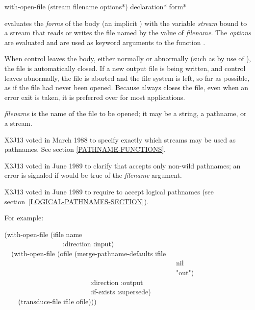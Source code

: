 \begin{defmac}
with-open-file (stream filename {options}*)
               {declaration}* {form}*

evaluates the \emph{forms} of the body (an implicit ) with the variable
\emph{stream} bound to a stream that reads or writes the file named by the
value of \emph{filename}.
The \emph{options} are evaluated and are used as keyword arguments to
the function .

When control leaves the body, either normally or abnormally (such as by
use of ), the file is automatically closed.  If a new
output file is being written, and control leaves abnormally, the file is
aborted and the file system is left, so far as possible, as if the file
had never been opened.  Because  always closes the
file, even when an error exit is taken, it is preferred over  for
most applications.

\emph{filename} is the name of the file to be opened; it may be a string,
a pathname, or a stream.

\begin{new}
X3J13 voted in March 1988
to specify exactly which streams may be used as pathnames.
See section \ref{PATHNAME-FUNCTIONS}.
\end{new}

\begin{newer}
X3J13 voted in June 1989 
to clarify that  accepts only non-wild pathnames;
an error is signaled if  would be true of
the \emph{filename} argument.
\end{newer}

\begin{newer}
X3J13 voted in June 1989  to require 
to accept logical pathnames (see section~\ref{LOGICAL-PATHNAMES-SECTION}).
\end{newer}


For example:
\begin{lisp}
(with-open-file (ifile name \\
~~~~~~~~~~~~~~~~~:direction :input) \\
~~(with-open-file (ofile (merge-pathname-defaults ifile \\
~~~~~~~~~~~~~~~~~~~~~~~~~~~~~~~~~~~~~~~~~~~~~~~~~~nil \\
~~~~~~~~~~~~~~~~~~~~~~~~~~~~~~~~~~~~~~~~~~~~~~~~~~"out") \\
~~~~~~~~~~~~~~~~~~~~~~~~~:direction :output \\
~~~~~~~~~~~~~~~~~~~~~~~~~:if-exists :supersede) \\
~~~~(transduce-file ifile ofile)))
\end{lisp}


\end{defmac}

